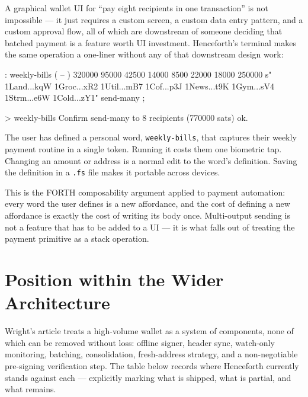 \documentclass[a4paper, 11pt]{article}
\begin{document}
A graphical wallet UI for ``pay eight recipients in one transaction'' is not impossible --- it just requires a custom screen, a custom data entry pattern, and a custom approval flow, all of which are downstream of someone deciding that batched payment is a feature worth UI investment. Henceforth's terminal makes the same operation a one-liner without any of that downstream design work:

\begin{forthbox}[Composability]
  : weekly-bills  ( -- )
     320000 95000 42500 14000 8500 22000 18000 250000
     s" 1Land...kqW 1Groc...xR2 1Util...mB7 1Cof...p3J
        1News...t9K 1Gym...sV4 1Strm...e6W 1Cold...zY1"
     send-many ;

  > weekly-bills
  Confirm send-many to 8 recipients (770000 sats)
   ok.
\end{forthbox}

The user has defined a personal word, \texttt{weekly-bills}, that captures their weekly payment routine in a single token. Running it costs them one biometric tap. Changing an amount or address is a normal edit to the word's definition. Saving the definition in a \texttt{.fs} file makes it portable across devices.

This is the FORTH composability argument applied to payment automation: every word the user defines is a new affordance, and the cost of defining a new affordance is exactly the cost of writing its body once. Multi-output sending is not a feature that has to be added to a UI --- it is what falls out of treating the payment primitive as a stack operation.

\section{Position within the Wider Architecture}
\label{sec:position}

Wright's article treats a high-volume wallet as a system of components, none of which can be removed without loss: offline signer, header sync, watch-only monitoring, batching, consolidation, fresh-address strategy, and a non-negotiable pre-signing verification step. The table below records where Henceforth currently stands against each --- explicitly marking what is shipped, what is partial, and what remains.
\end{document}
